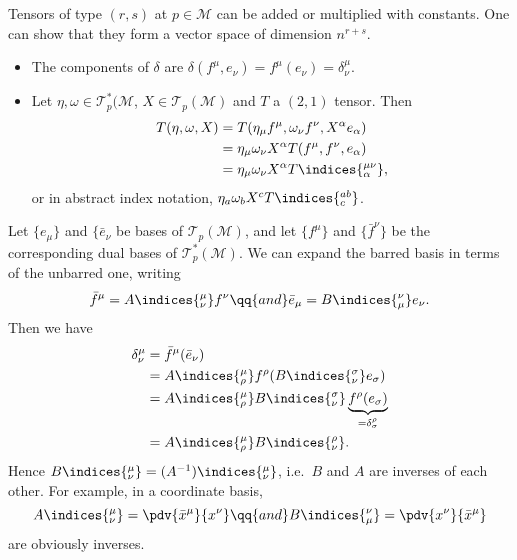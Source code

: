 \documentclass{jknotes}
\begin{document}
Tensors of type \((r,s)\) at \(p\in\mathcal{M}\) can be added or multiplied with constants. One can show that they form a vector space of dimension \(n^{r+s}\).
\begin{eg}
    \begin{itemize}
        \item The components of \(\delta\) are \(\delta(f^\mu,e_\nu) = f^\mu(e_\nu) = \delta^\mu_\nu\).
        \item Let \(\eta,\omega\in\mathcal{T}_p^*(\mathcal{M}\), \(X\in \mathcal{T}_p(\mathcal{M})\) and \(T\) a \((2,1)\) tensor. Then
            \begin{align}
                T(\eta,\omega,X) &= T(\eta_\mu f^\mu,\omega_\nu f^\nu,X^\alpha e_\alpha) \\
                                 &= \eta_\mu\omega_\nu X^\alpha T(f^\mu,f^\nu,e_\alpha) \\
                                 &= \eta_\mu\omega_\nu X^\alpha T\indices{^{\mu\nu}_\alpha},
            \end{align}
            or in abstract index notation, \(\eta_a\omega_b X^c T\indices{^{ab}_c}\).
    \end{itemize}
\end{eg}

Let \(\{e_\mu\}\) and \(\{\bar{e}_\nu\) be bases of \(\mathcal{T}_p(\mathcal{M})\), and let \(\{f^\mu\}\) and \(\{\bar{f}^\nu\}\) be the corresponding dual bases of \(\mathcal{T}_p^*(\mathcal{M})\). We can expand the barred basis in terms of the unbarred one, writing
\begin{equation}
    \bar{f}^\mu = A\indices{^\mu_\nu} f^\nu \qq{and} \bar{e}_\mu = B\indices{^\nu_\mu}e_\nu.
\end{equation}
Then we have
\begin{align}
    \delta^\mu_\nu &= \bar{f}^\mu(\bar{e}_\nu) \\
                   &= A\indices{^\mu_\rho} f^\rho(B\indices{^\sigma_\nu}e_\sigma) \\
                   &= A\indices{^\mu_\rho}B\indices{^\sigma_\nu} \underbrace{f^\rho(e_\sigma)}_{=\delta^\rho_\sigma} \\
                   &= A\indices{^\mu_\rho}B\indices{^\rho_\nu}.
\end{align}
Hence \(B\indices{^\mu_\nu} = (A^{-1})\indices{^\mu_\nu}\), i.e.\ \(B\) and \(A\) are inverses of each other. For example, in a coordinate basis,
\begin{equation}
    A\indices{^\mu_\nu} = \pdv{\bar{x}^\mu}{x^\nu} \qq{and} B\indices{^\nu_\mu} = \pdv{x^\nu}{\bar{x}^\mu}
\end{equation}
are obviously inverses.
\end{document}
